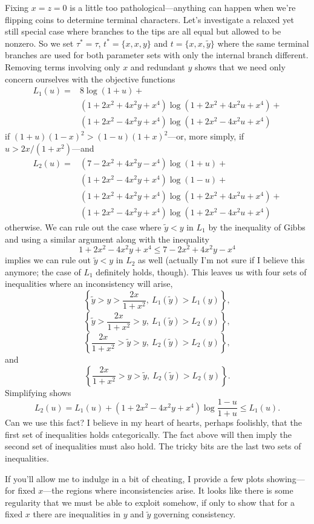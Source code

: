 \documentclass[a4paper]{article}
\begin{document}
Fixing $x=z=0$ is a little too pathological---anything can happen when we're flipping coins to determine terminal characters.
Let's investigate a relaxed yet still special case where branches to the tips are all equal but allowed to be nonzero.
So we set $\tau^*=\tau$, $t^*=\{x,x,y\}$ and $t=\{x,x,\tilde{y}\}$ where the same terminal branches are used for both parameter sets with only the internal branch different.
Removing terms involving only $x$ and redundant $y$ shows that we need only concern ourselves with the objective functions
\begin{align*}
L_1(u) =& 8\log(1+u) + \\
  &(1+2x^2+4x^2y+x^4)\log(1+2x^2+4x^2u+x^4) + \\
  &(1+2x^2-4x^2y+x^4)\log(1+2x^2-4x^2u+x^4)
\end{align*}
if $(1+u)(1-x)^2 > (1-u)(1+x)^2$---or, more simply, if $u > 2x / (1+x^2)$---and
\begin{align*}
L_2(u) =& (7-2x^2+4x^2y-x^4)\log(1+u) + \\
  &(1+2x^2-4x^2y+x^4)\log(1-u) + \\
  &(1+2x^2+4x^2y+x^4)\log(1+2x^2+4x^2u+x^4) + \\
  &(1+2x^2-4x^2y+x^4)\log(1+2x^2-4x^2u+x^4)
\end{align*}
otherwise.
We can rule out the case where $\tilde{y} < y$ in $L_1$ by the inequality of Gibbs and using a similar argument along with the inequality
$$
1+2x^2-4x^2y+x^4 \le 7-2x^2+4x^2y-x^4
$$
implies we can rule out $\tilde{y} < y$ in $L_2$ as well (actually I'm not sure if I believe this anymore; the case of $L_1$ definitely holds, though).
This leaves us with four sets of inequalities where an inconsistency will arise,
$$
\left\{\tilde{y} > y > \frac{2x}{1+x^2}, \ L_1(\tilde{y}) > L_1(y)\right\}, 
$$
$$
\left\{\tilde{y} > \frac{2x}{1+x^2} > y, \ L_1(\tilde{y}) > L_2(y)\right\}, 
$$
$$
\left\{\frac{2x}{1+x^2} > \tilde{y} > y, \ L_2(\tilde{y}) > L_2(y)\right\},
$$
and
$$
\left\{\frac{2x}{1+x^2} > y > \tilde{y}, \ L_2(\tilde{y}) > L_2(y)\right\}.
$$
Simplifying shows
$$
L_2(u) = L_1(u) + (1+2x^2-4x^2y+x^4)\log\frac{1-u}{1+u} \le L_1(u).
$$
Can we use this fact?
I believe in my heart of hearts, perhaps foolishly, that the first set of inequalities holds categorically.
The fact above will then imply the second set of inequalities must also hold.
The tricky bits are the last two sets of inequalities.

If you'll allow me to indulge in a bit of cheating, I provide a few plots showing---for fixed $x$---the regions where inconsistencies arise.
It looks like there is some regularity that we must be able to exploit somehow, if only to show that for a fixed $x$ there are inequalities in $y$ and $\tilde{y}$ governing consistency.
\end{document}
